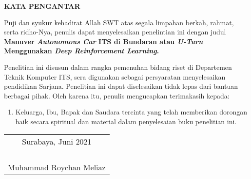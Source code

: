 \begin{center}
  \Large
  \textbf{KATA PENGANTAR}
\end{center}


\vspace{2ex}


Puji dan syukur kehadirat Allah SWT atas segala limpahan berkah, rahmat, serta ridho-Nya, penulis dapat menyelesaikan penelintian ini dengan judul \textbf{Manuver \textit{Autonomous Car }ITS di Bundaran atau \textit{U-Turn }Menggunakan \textit{Deep Reinforcement Learning}.}

Penelitian ini disusun dalam rangka pemenuhan bidang riset di Departemen Teknik Komputer ITS, sera digunakan sebagai persyaratan menyelesaikan pendidikan Sarjana. Penelitian ini dapat diselesaikan tidak lepas dari bantuan berbagai pihak. Oleh karena itu, penulis mengucapkan terimakasih kepada:

\begin{enumerate}[nolistsep]
	
	\item Keluarga, Ibu, Bapak dan Saudara tercinta yang telah memberikan dorongan baik secara spiritual dan material dalam penyelesaian buku penelitian ini. 
	
\end{enumerate}

\begin{flushright}
  \begin{tabular}[b]{c}
    Surabaya, Juni 2021\\
    \\
    \\
    \\
    \\
    Muhammad Roychan Meliaz
  \end{tabular}
\end{flushright}
